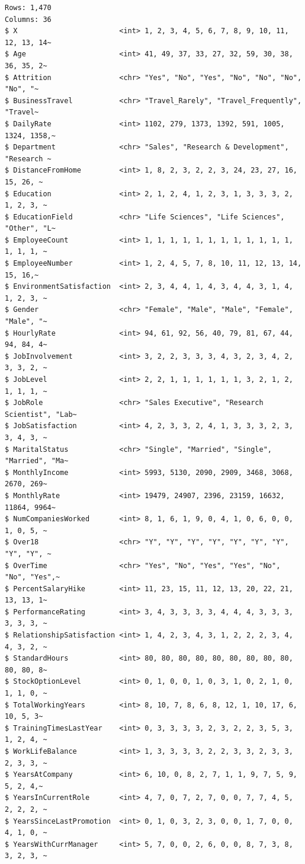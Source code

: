 \documentclass[
  letterpaper,
  DIV=11,
  numbers=noendperiod]{scrreprt}
\theoremstyle{definition}
\theoremstyle{remark}
\begin{document}
\begin{verbatim}
Rows: 1,470
Columns: 36
$ X                        <int> 1, 2, 3, 4, 5, 6, 7, 8, 9, 10, 11, 12, 13, 14~
$ Age                      <int> 41, 49, 37, 33, 27, 32, 59, 30, 38, 36, 35, 2~
$ Attrition                <chr> "Yes", "No", "Yes", "No", "No", "No", "No", "~
$ BusinessTravel           <chr> "Travel_Rarely", "Travel_Frequently", "Travel~
$ DailyRate                <int> 1102, 279, 1373, 1392, 591, 1005, 1324, 1358,~
$ Department               <chr> "Sales", "Research & Development", "Research ~
$ DistanceFromHome         <int> 1, 8, 2, 3, 2, 2, 3, 24, 23, 27, 16, 15, 26, ~
$ Education                <int> 2, 1, 2, 4, 1, 2, 3, 1, 3, 3, 3, 2, 1, 2, 3, ~
$ EducationField           <chr> "Life Sciences", "Life Sciences", "Other", "L~
$ EmployeeCount            <int> 1, 1, 1, 1, 1, 1, 1, 1, 1, 1, 1, 1, 1, 1, 1, ~
$ EmployeeNumber           <int> 1, 2, 4, 5, 7, 8, 10, 11, 12, 13, 14, 15, 16,~
$ EnvironmentSatisfaction  <int> 2, 3, 4, 4, 1, 4, 3, 4, 4, 3, 1, 4, 1, 2, 3, ~
$ Gender                   <chr> "Female", "Male", "Male", "Female", "Male", "~
$ HourlyRate               <int> 94, 61, 92, 56, 40, 79, 81, 67, 44, 94, 84, 4~
$ JobInvolvement           <int> 3, 2, 2, 3, 3, 3, 4, 3, 2, 3, 4, 2, 3, 3, 2, ~
$ JobLevel                 <int> 2, 2, 1, 1, 1, 1, 1, 1, 3, 2, 1, 2, 1, 1, 1, ~
$ JobRole                  <chr> "Sales Executive", "Research Scientist", "Lab~
$ JobSatisfaction          <int> 4, 2, 3, 3, 2, 4, 1, 3, 3, 3, 2, 3, 3, 4, 3, ~
$ MaritalStatus            <chr> "Single", "Married", "Single", "Married", "Ma~
$ MonthlyIncome            <int> 5993, 5130, 2090, 2909, 3468, 3068, 2670, 269~
$ MonthlyRate              <int> 19479, 24907, 2396, 23159, 16632, 11864, 9964~
$ NumCompaniesWorked       <int> 8, 1, 6, 1, 9, 0, 4, 1, 0, 6, 0, 0, 1, 0, 5, ~
$ Over18                   <chr> "Y", "Y", "Y", "Y", "Y", "Y", "Y", "Y", "Y", ~
$ OverTime                 <chr> "Yes", "No", "Yes", "Yes", "No", "No", "Yes",~
$ PercentSalaryHike        <int> 11, 23, 15, 11, 12, 13, 20, 22, 21, 13, 13, 1~
$ PerformanceRating        <int> 3, 4, 3, 3, 3, 3, 4, 4, 4, 3, 3, 3, 3, 3, 3, ~
$ RelationshipSatisfaction <int> 1, 4, 2, 3, 4, 3, 1, 2, 2, 2, 3, 4, 4, 3, 2, ~
$ StandardHours            <int> 80, 80, 80, 80, 80, 80, 80, 80, 80, 80, 80, 8~
$ StockOptionLevel         <int> 0, 1, 0, 0, 1, 0, 3, 1, 0, 2, 1, 0, 1, 1, 0, ~
$ TotalWorkingYears        <int> 8, 10, 7, 8, 6, 8, 12, 1, 10, 17, 6, 10, 5, 3~
$ TrainingTimesLastYear    <int> 0, 3, 3, 3, 3, 2, 3, 2, 2, 3, 5, 3, 1, 2, 4, ~
$ WorkLifeBalance          <int> 1, 3, 3, 3, 3, 2, 2, 3, 3, 2, 3, 3, 2, 3, 3, ~
$ YearsAtCompany           <int> 6, 10, 0, 8, 2, 7, 1, 1, 9, 7, 5, 9, 5, 2, 4,~
$ YearsInCurrentRole       <int> 4, 7, 0, 7, 2, 7, 0, 0, 7, 7, 4, 5, 2, 2, 2, ~
$ YearsSinceLastPromotion  <int> 0, 1, 0, 3, 2, 3, 0, 0, 1, 7, 0, 0, 4, 1, 0, ~
$ YearsWithCurrManager     <int> 5, 7, 0, 0, 2, 6, 0, 0, 8, 7, 3, 8, 3, 2, 3, ~
\end{verbatim}
\end{document}
